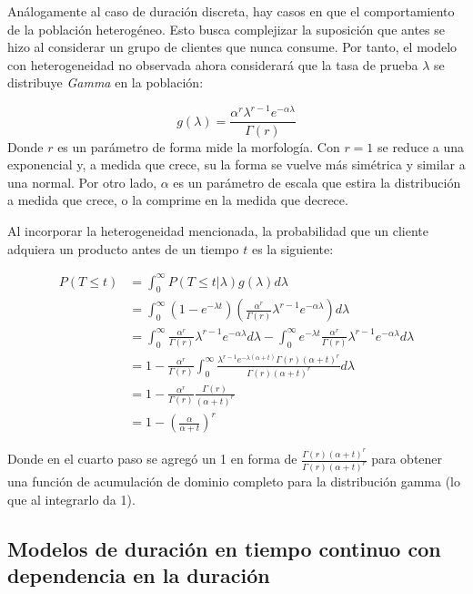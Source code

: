 \documentclass[
]{book}
\begin{document}
Análogamente al caso de duración discreta, hay casos en que el
comportamiento de la población heterogéneo. Esto busca complejizar la
suposición que antes se hizo al considerar un grupo de clientes que
nunca consume. Por tanto, el modelo con heterogeneidad no observada
ahora considerará que la tasa de prueba \(\lambda\) se distribuye \emph{Gamma}
en la población:

\[g(\lambda) = \frac{\alpha^r \lambda^{r-1} e^{-\alpha \lambda}}{\Gamma(r)}\]Donde
\(r\) es un parámetro de forma mide la morfología. Con \(r=1\) se reduce a
una exponencial y, a medida que crece, su la forma se vuelve más
simétrica y similar a una normal. Por otro lado, \(\alpha\) es un
parámetro de escala que estira la distribución a medida que crece, o la
comprime en la medida que decrece.

Al incorporar la heterogeneidad mencionada, la probabilidad que un
cliente adquiera un producto antes de un tiempo \(t\) es la siguiente:

\[ 
\begin{aligned} P(T\leq t) &= \int_{0}^{\infty} P(T \leq t|\lambda) g(\lambda)d \lambda \\ &= \int_{0}^{\infty} (1 - e^{-\lambda t}) \left( \frac{\alpha^r}{\Gamma(r)} \lambda^{r-1} e^{-\alpha \lambda} \right) d\lambda \\ &= \int_{0}^{\infty} \frac{\alpha^r}{\Gamma(r)} \lambda^{r-1} e^{-\alpha \lambda} d\lambda - \int_{0}^{\infty} e^{-\lambda t} \frac{\alpha^r}{\Gamma(r)} \lambda^{r-1} e^{-\alpha \lambda} d\lambda \\ &= 1 - \frac{\alpha^r}{\Gamma(r)} \int_{0}^{\infty} \frac{\lambda^{r-1} e^{-\lambda(\alpha+t)} \Gamma(r) (\alpha + t)^r}{\Gamma(r) (\alpha + t)^r} d\lambda \\ &= 1 - \frac{\alpha^r}{\Gamma(r)} \frac{\Gamma(r)}{(\alpha+t)^r} \\ &= 1 - \left(\frac{\alpha}{\alpha + t}\right)^r \end{aligned} \]

Donde en el cuarto paso se agregó un 1 en forma de
\(\frac{\Gamma(r) (\alpha + t)^r}{\Gamma(r) (\alpha + t)^r}\) para obtener
una función de acumulación de dominio completo para la distribución
gamma (lo que al integrarlo da 1).

\subsection{Modelos de duración en tiempo continuo con dependencia en la duración}\label{modelos-de-duraciuxf3n-en-tiempo-continuo-con-dependencia-en-la-duraciuxf3n}
\end{document}
